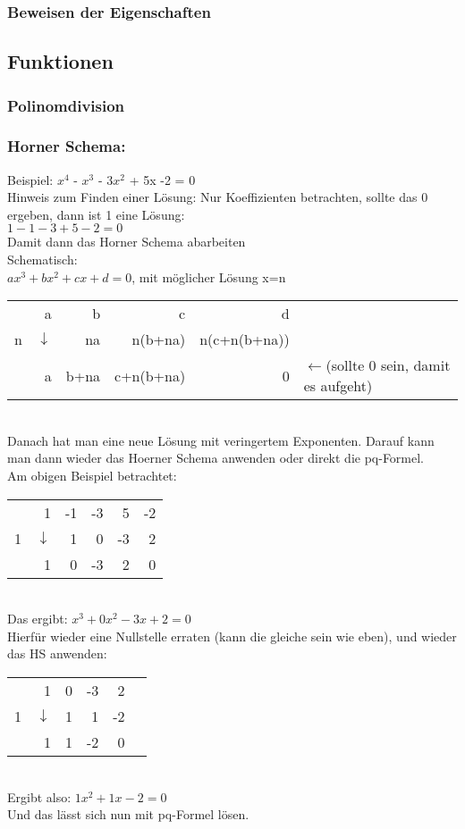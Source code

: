 \documentclass[6pt,a4paper]{scrartcl}
\begin{document}
\begin{multicols*}{2}
\subsubsection{Beweisen der Eigenschaften}

\subsection{Funktionen}
\subsubsection{Polinomdivision}

\subsubsection{Horner Schema:}
Beispiel: $x^4$ - $x^3$ - $3x^2$ + 5x -2 = 0\\
Hinweis zum Finden einer Lösung: Nur Koeffizienten betrachten, sollte das 0 ergeben, dann ist 1 eine Lösung:\\
$1 - 1 -3 + 5 - 2 = 0$\\
Damit dann das Horner Schema abarbeiten\\
Schematisch:\\
$ax^3 + bx^2 + cx + d = 0$, mit möglicher Lösung x=n\\
\begin{tabular}{r|rrrrl}
	& a 				& b 		& c 			& d &\\
n 	& $\downarrow$	& na 	& n(b+na) 	& n(c+n(b+na)) &\\
\hline
 	& a 				& b+na 	& c+n(b+na) 	& 0 & $\leftarrow$(sollte 0 sein, damit es aufgeht)\\
\end{tabular}\\
Danach hat man eine neue Lösung mit veringertem Exponenten. Darauf kann man dann wieder das Hoerner Schema anwenden oder direkt die pq-Formel.\\
Am obigen Beispiel betrachtet:\\
\begin{tabular}{r|rrrrr}
	& 1 				& -1 & -3 & 5  & -2\\
1 	& $\downarrow$	& 1 	 & 0  & -3 & 2\\
\hline
 	& 1 				& 0 	 & -3 & 2 & 0\\
\end{tabular}\\
Das ergibt: $x^3 + 0x^2 -3x +2 = 0$\\
Hierfür wieder eine Nullstelle erraten (kann die gleiche sein wie eben), und wieder das HS anwenden:\\
\begin{tabular}{r|rrrrr}
	& 1 				& 0 & -3 & 2\\
1 	& $\downarrow$	& 1 	& 1  & -2\\
\hline
 	& 1 				& 1 	& -2 & 0\\
\end{tabular}\\
Ergibt also: $1x^2 + 1x -2 = 0$\\
Und das lässt sich nun mit pq-Formel lösen.\\


\end{multicols*}
\end{document}
